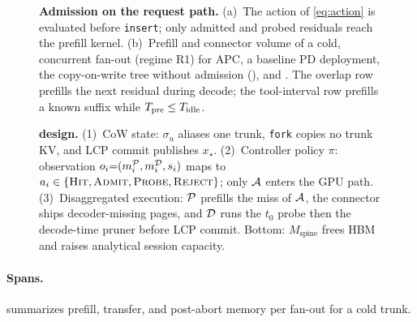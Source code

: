 \begin{figure}[t]
\centering
\resizebox{\textwidth}{!}{}
\caption{\textbf{Admission on the request path.}
(a)~The action of \eqref{eq:action} is evaluated before \texttt{insert}; only admitted and probed residuals reach the prefill kernel.
(b)~Prefill and connector volume of a cold, concurrent fan-out (regime R1) for APC, a baseline PD deployment, the copy-on-write tree without admission (\cowonly), and \sys.
The overlap row prefills the next residual during decode; the tool-interval row prefills a known suffix while $T_{\mathrm{pre}}\le T_{\mathrm{idle}}$.}
\label{fig:app}
\end{figure}

\begin{figure}[t]
\centering
\resizebox{\textwidth}{!}{}
\caption{\textbf{\sys{} design.}
(1)~CoW state: $\sigma_u$ aliases one trunk, \texttt{fork} copies no trunk KV, and LCP commit publishes $x_\star$.
(2)~Controller policy $\pi$: observation $o_i{=}(m_i^{\mathcal{P}},m_i^{\mathcal{D}},s_i)$ maps to $a_i\in\{\textsc{Hit},\textsc{Admit},\textsc{Probe},\textsc{Reject}\}$; only $\mathcal{A}$ enters the GPU path.
(3)~Disaggregated execution: $\mathcal{P}$ prefills the miss of $\mathcal{A}$, the connector ships decoder-missing pages, and $\mathcal{D}$ runs the $t_0$ probe then the decode-time pruner before LCP commit.
Bottom: $M_{\mathrm{spine}}$ frees HBM and raises analytical session capacity.}
\label{fig:arch-detail}
\end{figure}

\paragraph{Spans.}
 summarizes prefill, transfer, and post-abort memory per fan-out for a cold trunk.

